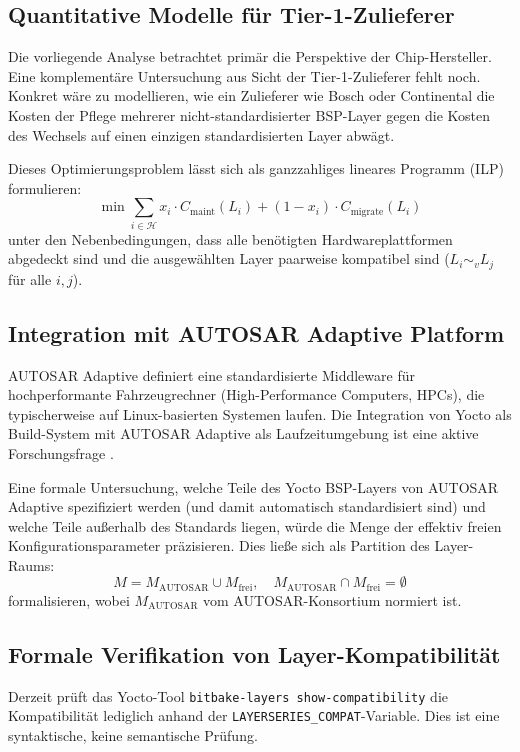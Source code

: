 ﻿\documentclass[a4paper,12pt]{article}
\theoremstyle{definition}
\begin{document}
\subsection{Quantitative Modelle für Tier-1-Zulieferer}

Die vorliegende Analyse betrachtet primär die Perspektive der Chip-Hersteller.
Eine komplementäre Untersuchung aus Sicht der Tier-1-Zulieferer fehlt noch.
Konkret wäre zu modellieren, wie ein Zulieferer wie Bosch oder Continental
die Kosten der Pflege mehrerer nicht-standardisierter BSP-Layer gegen die
Kosten des Wechsels auf einen einzigen standardisierten Layer abwägt.

Dieses Optimierungsproblem lässt sich als ganzzahliges lineares Programm (ILP) formulieren:
\[
\min \sum_{i \in \mathcal{H}} x_i \cdot C_{\mathrm{maint}}(L_i) + (1 - x_i) \cdot C_{\mathrm{migrate}}(L_i)
\]
unter den Nebenbedingungen, dass alle benötigten Hardwareplattformen abgedeckt sind
und die ausgewählten Layer paarweise kompatibel sind ($L_i \sim_v L_j$ für alle $i,j$).

\subsection{Integration mit AUTOSAR Adaptive Platform}

AUTOSAR Adaptive \cite{autosar2024} definiert eine standardisierte Middleware
für hochperformante Fahrzeugrechner (High-Performance Computers, HPCs),
die typischerweise auf Linux-basierten Systemen laufen. Die Integration von
Yocto als Build-System mit AUTOSAR Adaptive als Laufzeitumgebung ist eine
aktive Forschungsfrage \cite{thaler2022}.

Eine formale Untersuchung, welche Teile des Yocto BSP-Layers von AUTOSAR Adaptive
spezifiziert werden (und damit automatisch standardisiert sind) und welche
Teile außerhalb des Standards liegen, würde die Menge der effektiv freien
Konfigurationsparameter präzisieren. Dies ließe sich als Partition des Layer-Raums:
\[
M = M_{\mathrm{AUTOSAR}} \cup M_{\mathrm{frei}}, \quad M_{\mathrm{AUTOSAR}} \cap M_{\mathrm{frei}} = \emptyset
\]
formalisieren, wobei $M_{\mathrm{AUTOSAR}}$ vom AUTOSAR-Konsortium normiert ist.

\subsection{Formale Verifikation von Layer-Kompatibilität}

Derzeit prüft das Yocto-Tool \texttt{bitbake-layers show-compatibility}
die Kompatibilität lediglich anhand der \texttt{LAYERSERIES\_COMPAT}-Variable.
Dies ist eine syntaktische, keine semantische Prüfung.
\end{document}
